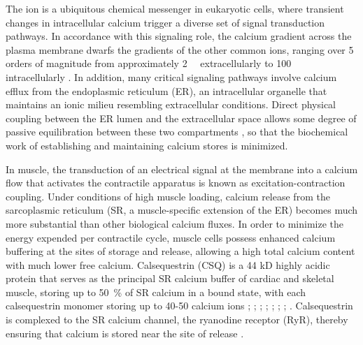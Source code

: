 
%
\noindent The  ion is a ubiquitous chemical messenger in eukaryotic cells, where transient changes in intracellular calcium trigger a diverse set of signal transduction pathways. In accordance with this signaling role, the calcium gradient across the plasma membrane dwarfs the gradients of the other common ions, ranging over 5 orders of magnitude from approximately \SI{2}{\milli\Molar} extracellularly to \SI{100}{\nano\Molar} intracellularly \cite{Carafoli2016-hx}. In addition, many critical signaling pathways involve calcium efflux from the endoplasmic reticulum (ER), an intracellular organelle that maintains an ionic milieu resembling extracellular conditions. Direct physical coupling between the ER lumen and the extracellular space allows some degree of passive equilibration between these two compartments \cite{Prakriya2015-vs}, so that the biochemical work of establishing and maintaining calcium stores is minimized.

In muscle, the transduction of an electrical signal at the membrane into a calcium flow that activates the contractile apparatus is known as excitation-contraction coupling. Under conditions of high muscle loading, calcium release from the sarcoplasmic reticulum (SR, a muscle-specific extension of the ER) becomes much more substantial than other biological calcium fluxes. In order to minimize the energy expended per contractile cycle, muscle cells possess enhanced calcium buffering at the sites of storage and release, allowing a high total calcium content with much lower free calcium. Calsequestrin (CSQ) is a 44 kD highly acidic protein that serves as the principal SR calcium buffer of cardiac and skeletal muscle, storing up to \SI{50}{\percent} of SR calcium in a bound state, with each calsequestrin monomer storing up to 40-50 calcium ions \cite{MacLennan1971-fw}; \cite{MacLennan1974-rv}; \cite{Ostwald1974-yr}; \cite{Costello1986-ma}; \cite{Franzini-Armstrong1987-xb}; \cite{Wang1998-cm}; \cite{Park2004-bu}; \cite{Knollmann2006-vy}. Calsequestrin is complexed to the SR calcium channel, the ryanodine receptor (RyR), thereby ensuring that calcium is stored near the site of release \cite{Bers2004-ns}. %

